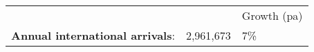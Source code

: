\begin{tabular}[t]{p{4.8cm}>{\hfill}p{1.3cm}>{\hfill}p{1.4cm}}
   &   & Growth (pa) \\ 
 \textbf{Annual international arrivals}: & 2,961,673 & 7\% \\ 
  \end{tabular}
